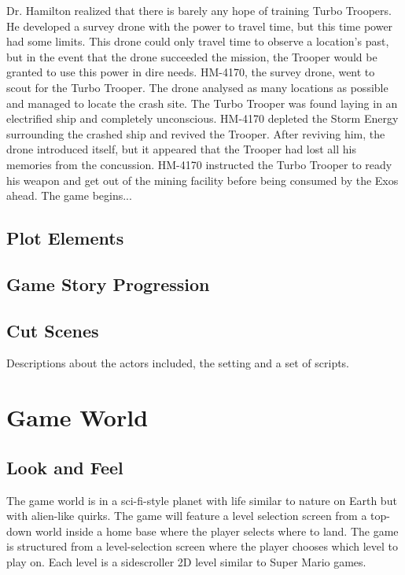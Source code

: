 \documentclass[12pt]{article}
\begin{document}
Dr. Hamilton realized that there is barely any hope of training Turbo Troopers. He developed a survey drone with the power to travel time, but this time power had some limits. This drone could only travel time to observe a location's past, but in the event that the drone succeeded the mission, the Trooper would be granted to use this power in dire needs. HM-4170, the survey drone, went to scout for the Turbo Trooper. The drone analysed as many locations as possible and managed to locate the crash site. The Turbo Trooper was found laying in an electrified ship and completely unconscious. HM-4170 depleted the Storm Energy surrounding the crashed ship and revived the Trooper. After reviving him, the drone introduced itself, but it appeared that the Trooper had lost all his memories from the concussion. HM-4170 instructed the Turbo Trooper to ready his weapon and get out of the mining facility before being consumed by the Exos ahead. The game begins... 

\subsection{Plot Elements}

\subsection{Game Story Progression}

\subsection{Cut Scenes}

Descriptions about the actors included, the setting and a set of scripts.

\section{Game World}

\subsection{Look and Feel}

The game world is in a sci-fi-style planet with life similar to nature on Earth but with alien-like quirks. The game will feature a level selection screen from a top-down world inside a home base where the player selects where to land. The game is structured from a level-selection screen where the player chooses which level to play on. Each level is a sidescroller 2D level similar to Super Mario games. 
\end{document}
